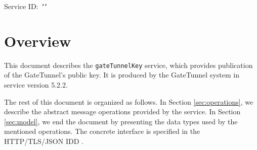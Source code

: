\documentclass[a4paper]{arrowhead}
\begin{document}
\sloppy

\ArrowheadSetup

\begin{center}
  \vspace*{1cm}
  \huge{\arrowtitle}

  \vspace*{0.2cm}
  \LARGE{\arrowtype}
  \vspace*{1cm}

  \Large{Service ID: \textit{"\arrowid"}}

  \vspace*{\fill}


  \vspace*{1cm}
  \vspace*{\fill}

  \begin{abstract}
    This document describes the \texttt{gateTunnelKey} service, version 5.2.2, produced by the GateTunnel support system of Arrowhead 5.2.2.
  \end{abstract}

  \vspace*{1cm}
\end{center}

\newpage

\tableofcontents
\newpage

\section{Overview}
\label{sec:overview}

This document describes the \texttt{gateTunnelKey} service, which provides publication of the GateTunnel's public key.
It is produced by the GateTunnel system \cite{gt-sysd} in service version 5.2.2.

The rest of this document is organized as follows.
In Section \ref{sec:operations}, we describe the abstract message operations provided by the service.
In Section \ref{sec:model}, we end the document by presenting the data types used by the mentioned operations.
The concrete interface is specified in the HTTP/TLS/JSON IDD \cite{gt-gateTunnelKey-http-idd}.
\end{document}

